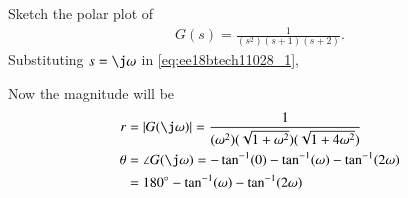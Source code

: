 \item Sketch the polar plot of 
\begin{align}
    G(s) = \frac{1}{(s^2)(s+1)(s+2)}. 
    \label{eq:ee18btech11028_1}
\end{align}
%
\solution
Substituting $s = \j\omega$ in      \eqref{eq:ee18btech11028_1},

Now the magnitude will be
\begin{align}
   r &=  |G(\j\omega)| = \frac{1}{(\omega^2)(\sqrt{1 + \omega^2})(\sqrt{1+4\omega^2})}
    \label{eq:ee18btech11028_2}
\\
\theta &=\angle G(\j\omega)  = - \tan^{-1}(0) - \tan^{-1}(\omega) - \tan^{-1}(2\omega)
\\
     &= 180\degree - \tan^{-1}(\omega) - \tan^{-1}(2\omega)
    \label{eq:ee18btech11028_3}
\end{align}

